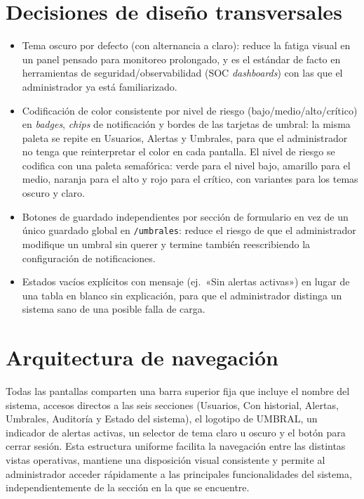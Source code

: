 \section{Decisiones de diseño transversales}
\label{sec:decisiones-transversales-mockups}
\begin{itemize}
	\item Tema oscuro por defecto (con alternancia a claro): reduce la fatiga visual en un panel pensado para monitoreo prolongado, y es el estándar de facto en herramientas de seguridad/observabilidad (SOC \emph{dashboards}) con las que el administrador ya está familiarizado.
	\item Codificación de color consistente por nivel de riesgo (bajo/medio/alto/crítico) en \emph{badges}, \emph{chips} de notificación y bordes de las tarjetas de umbral: la misma paleta se repite en Usuarios, Alertas y Umbrales, para que el administrador no tenga que reinterpretar el color en cada pantalla. El nivel de riesgo se codifica con una paleta semafórica: verde para el nivel bajo, amarillo para el medio, naranja para el alto y rojo para el crítico, con variantes para los temas oscuro y claro.
	\item Botones de guardado independientes por sección de formulario en vez de un único guardado global en \texttt{/umbrales}: reduce el riesgo de que el administrador modifique un umbral sin querer y termine también reescribiendo la configuración de notificaciones.
	\item Estados vacíos explícitos con mensaje (ej.\ «Sin alertas activas») en lugar de una tabla en blanco sin explicación, para que el administrador distinga un sistema sano de una posible falla de carga.
\end{itemize}

\section{Arquitectura de navegación}
Todas las pantallas comparten una barra superior fija que incluye el nombre del sistema, accesos directos a las seis secciones (Usuarios, Con historial, Alertas, Umbrales, Auditoría y Estado del sistema), el logotipo de UMBRAL, un indicador de alertas activas, un selector de tema claro u oscuro y el botón para cerrar sesión. Esta estructura uniforme facilita la navegación entre las distintas vistas operativas, mantiene una disposición visual consistente y permite al administrador acceder rápidamente a las principales funcionalidades del sistema, independientemente de la sección en la que se encuentre.


